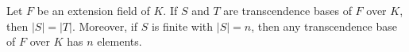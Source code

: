 Let $F$ be an extension field of $K$. If $S$ and $T$ are transcendence bases of $F$ over $K$, then $|S| = |T|$.
Moreover, if $S$ is finite with $|S| = n$, then any transcendence base of $F$ over $K$ has $n$ elements.
